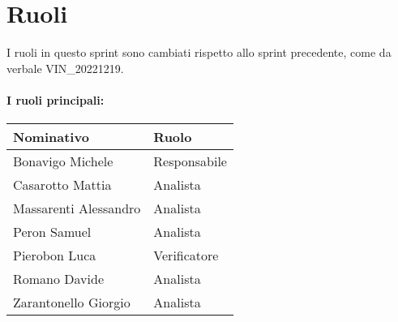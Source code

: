 \section{Ruoli}

I ruoli in questo sprint sono cambiati rispetto allo sprint precedente, come da verbale VIN\_20221219.

\paragraph{I ruoli principali:}

\begin{center}
    \begin{tabularx}{\textwidth}{X l}
        
        \rowcolor{gray!30} \textbf{Nominativo} & \textbf{Ruolo}\\
        
        \hline

        Bonavigo Michele & Responsabile \\
        \rowcolor{gray!10}Casarotto Mattia & Analista \\
        Massarenti Alessandro & Analista \\
        \rowcolor{gray!10}Peron Samuel & Analista \\
        Pierobon Luca & Verificatore \\
        \rowcolor{gray!10}Romano Davide & Analista \\
        Zarantonello Giorgio & Analista \\

    \end{tabularx}
\end{center}
